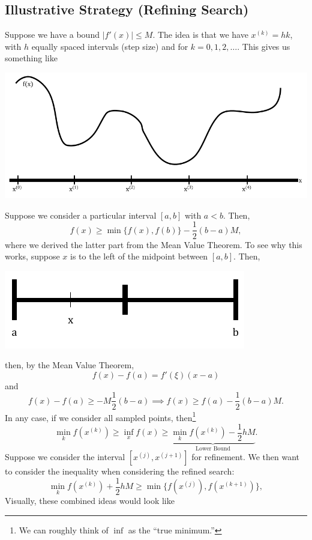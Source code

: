 \documentclass[letterpaper]{article}
\begin{document}
\subsection{Illustrative Strategy (Refining Search)}
Suppose we have a bound $|f'(x)| \leq M$. The idea is that we have $x^{(k)} = hk$, with $h$ equally spaced intervals (step size) and for $k = 0, 1, 2, \hdots$. This gives us something like 
\begin{center}
    \includegraphics[scale=0.5]{../assets/1varopt_ex2.png}
\end{center}
Suppose we consider a particular interval $[a, b]$ with $a < b$. Then, 
\[f(x) \geq \min\{f(x), f(b)\} - \frac{1}{2} (b - a) M,\]
where we derived the latter part from the Mean Value Theorem. To see why this works, suppose $x$ is to the left of the midpoint between $[a, b]$. Then, 
\begin{center}
    \includegraphics[scale=0.5]{../assets/interval_left.png}
\end{center}
then, by the Mean Value Theorem, \[f(x) - f(a) = f'(\xi)(x - a)\]
and \[f(x) - f(a) \geq -M\frac{1}{2}(b - a) \implies f(x) \geq f(a) - \frac{1}{2}(b - a)M.\]
In any case, if we consider all sampled points, then\footnote{We can roughly think of $\inf$ as the ``true minimum.''} 
\[\min_{k} f(x^{(k)}) \geq \inf_{x} f(x) \geq \underbrace{\min_{k} f(x^{(k)}) - \frac{1}{2}hM}_{\text{Lower Bound}}.\]
Suppose we consider the interval $[x^{(j)}, x^{(j + 1)}]$ for refinement. We then want to consider the inequality when considering the refined search:
\[\min_{k} f(x^{(k)}) + \frac{1}{2}hM \geq \min\{f(x^{(j)}), f(x^{(k + 1)})\},\]
Visually, these combined ideas would look like 
\end{document}
